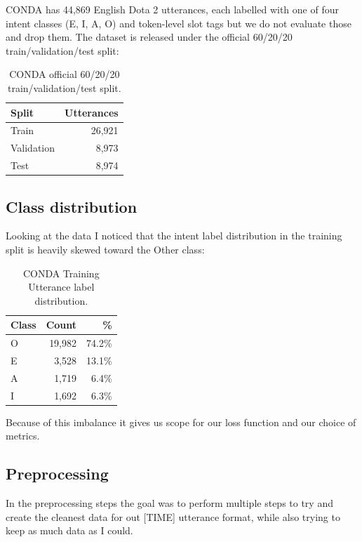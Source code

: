 \documentclass[a4paper,10.5pt,twoside]{article}
\begin{document}
CONDA has 44,869 English Dota 2 utterances, each labelled with one of four intent classes (E, I, A, O) and token-level slot tags but we do not evaluate those and drop them. The dataset is released under the official 60/20/20 train/validation/test split:

\begin{table}[H]
    \centering
    \begin{tabular}{l r}
    \toprule
    \textbf{Split} & \textbf{Utterances} \\
    \midrule
    Train      & 26,921 \\
    Validation & 8,973 \\
    Test       & 8,974 \\
    \bottomrule
    \end{tabular}
    \caption{CONDA official 60/20/20 train/validation/test split.}\label{tab:conda_split}
\end{table}

\subsection{Class distribution}

Looking at the data I noticed that the intent label distribution in the training split is heavily skewed toward the Other class:

\begin{table}[H]
    \centering
    \begin{tabular}{l r r}
    \toprule
    \textbf{Class} & \textbf{Count} & \textbf{\%} \\
    \midrule
    O & 19,982 & 74.2\% \\
    E &  3,528 & 13.1\% \\
    A &  1,719 &  6.4\% \\
    I &  1,692 &  6.3\% \\
    \bottomrule
    \end{tabular}
    \caption{CONDA Training Utterance label distribution.}\label{tab:conda_split}
\end{table}
Because of this imbalance it gives us scope for our loss function and our choice of metrics.



\subsection{Preprocessing}
In the preprocessing steps the goal was to perform multiple steps to try and create the cleanest data for out [TIME] utterance format, while also trying to keep as much data as I could. 
\vspace{1em}
\end{document}
